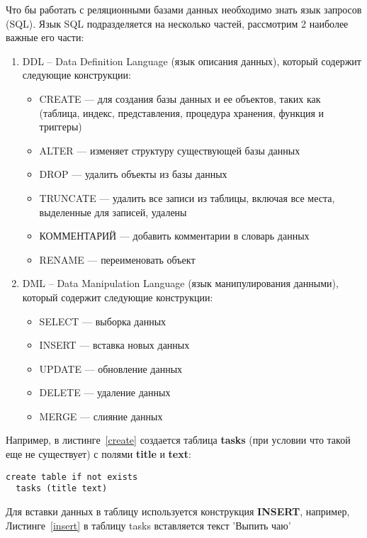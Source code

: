 \documentclass[a4paper]{article}
\begin{document}
Что бы работать с реляционными базами данных необходимо знать язык запросов (SQL).
Язык SQL подразделяется на несколько частей, рассмотрим 2 наиболее важные его части:
\begin{enumerate}
  \item DDL – Data Definition Language (язык описания данных), который содержит следующие конструкции:
    \begin{itemize}
      \item CREATE --- для создания базы данных и ее объектов, таких как (таблица, индекс, представления, процедура хранения, функция и триггеры)
      \item ALTER --- изменяет структуру существующей базы данных
      \item DROP --- удалить объекты из базы данных
      \item TRUNCATE --- удалить все записи из таблицы, включая все места, выделенные для записей, удалены
      \item КОММЕНТАРИЙ --- добавить комментарии в словарь данных
      \item RENAME --- переименовать объект
    \end{itemize}
  \item DML – Data Manipulation Language (язык манипулирования данными), который содержит следующие конструкции:
    \begin{itemize}
        \item SELECT --- выборка данных
        \item INSERT --- вставка новых данных
        \item UPDATE --- обновление данных
        \item DELETE --- удаление данных
        \item MERGE --- слияние данных
    \end{itemize}
\end{enumerate}

Например, в листинге~\ref{create} создается таблица \textbf{tasks} (при условии что такой еще не существует) с полями \textbf{title} и \textbf{text}:

\begin{lstlisting}[label=create,caption=Создание таблицы]
  create table if not exists
  tasks (title text)
\end{lstlisting}

Для вставки данных в таблицу используется конструкция \textbf{INSERT}, например, Листинге~\ref{insert} в таблицу tasks вставляется текст 'Выпить чаю'
\end{document}
